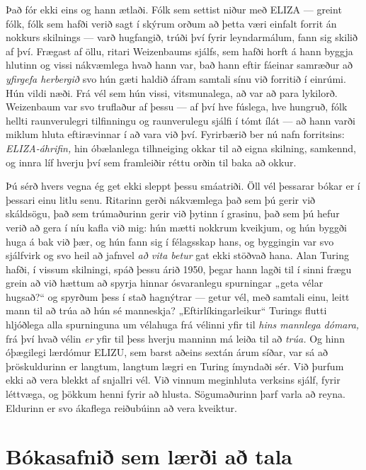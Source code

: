 Það fór ekki eins og hann ætlaði. Fólk sem settist niður með ELIZA — greint fólk, fólk sem hafði verið sagt í skýrum orðum að þetta væri einfalt forrit án nokkurs skilnings — varð hugfangið, trúði því fyrir leyndarmálum, fann sig skilið af því. Frægast af öllu, ritari Weizenbaums sjálfs, sem hafði horft á hann byggja hlutinn og vissi nákvæmlega hvað hann var, bað hann eftir fáeinar samræður að \emph{yfirgefa herbergið} svo hún gæti haldið áfram samtali sínu við forritið í einrúmi. Hún vildi næði. Frá vél sem hún vissi, vitsmunalega, að var að para lykilorð. Weizenbaum var svo truflaður af þessu — af því hve fúslega, hve hungruð, fólk hellti raunverulegri tilfinningu og raunverulegu sjálfi í tómt ílát — að hann varði miklum hluta eftirævinnar í að vara við því. Fyrirbærið ber nú nafn forritsins: \emph{ELIZA-áhrifin,} hin óbælanlega tilhneiging okkar til að eigna skilning, samkennd, og innra líf hverju því sem framleiðir réttu orðin til baka að okkur.

Þú sérð hvers vegna ég get ekki sleppt þessu smáatriði. Öll vél þessarar bókar er í þessari einu litlu senu. Ritarinn gerði nákvæmlega það sem þú gerir við skáldsögu, það sem trúmaðurinn gerir við þytinn í grasinu, það sem þú hefur verið að gera í níu kafla við mig: hún mætti nokkrum kveikjum, og hún byggði huga á bak við þær, og hún fann sig í félagsskap hans, og byggingin var svo sjálfvirk og svo heil að jafnvel \emph{að vita betur} gat ekki stöðvað hana. Alan Turing hafði, í vissum skilningi, spáð þessu árið 1950, þegar hann lagði til í sinni frægu grein að við hættum að spyrja hinnar ósvaranlegu spurningar „geta vélar hugsað?“ og spyrðum þess í stað hagnýtrar — getur vél, með samtali einu, leitt mann til að trúa að hún sé manneskja? „Eftirlíkingarleikur“ Turings flutti hljóðlega alla spurninguna um vélahuga frá vélinni yfir til \emph{hins mannlega dómara,} frá því hvað vélin \emph{er} yfir til þess hverju manninn má leiða til að \emph{trúa.} Og hinn óþægilegi lærdómur ELIZU, sem barst aðeins sextán árum síðar, var sá að þröskuldurinn er langtum, langtum lægri en Turing ímyndaði sér. Við þurfum ekki að vera blekkt af snjallri vél. Við vinnum meginhluta verksins sjálf, fyrir léttvæga, og þökkum henni fyrir að hlusta. Sögumaðurinn þarf varla að reyna. Eldurinn er svo ákaflega reiðubúinn að vera kveiktur.

\section*{Bókasafnið sem lærði að tala}

